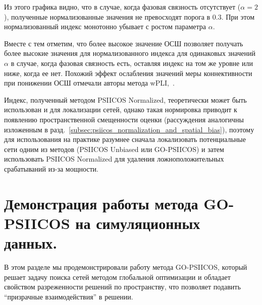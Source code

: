 Из этого графика видно, что в случае, когда фазовая связность отсутствует
($\alpha=2$), полученные нормализованные значения не превосходят порога в 0.3.
При этом нормализованный индекс монотонно убывает с ростом параметра $\alpha$.

Вместе с тем отметим, что более высокое значение ОСШ позволяет получать более
высокие значения для нормализованного индекса для одинаковых значений $\alpha$
в случае, когда фазовая связность есть, оставляя индекс на том же уровне или
ниже, когда ее нет. Похожий эффект ослабления значений меры коннективности при
понижении ОСШ отмечали авторы метода wPLI,~\cite{wPLI}.

Индекс, полученный методом PSIICOS Normalized, теоретически может быть
использован и для локализации сетей, однако такая нормировка приводит к
появлению пространственной смещенности оценки (рассуждения аналогичны изложенным
в разд.~\ref{subsec:psiicos_normalization_and_spatial_bias}), поэтому для
использования на практике разумнее сначала локализовать потенциальные сети
одним из методов (PSIICOS Unbiased или GO-PSIICOS) и затем использовать
PSIICOS Normalized для удаления ложноположительных срабатываний из-за мощности.

\section{Демонстрация работы метода GO-PSIICOS на симуляционных данных.}

В этом разделе мы продемонстрировали работу метода GO-PSIICOS, который решает
задачу поиска сетей методом глобальной оптимизации и обладает свойством разреженности
решений по пространству, что позволяет подавить ``призрачные взаимодействия'' в
решении.


